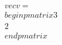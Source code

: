 \documentclass[preview]{standalone}
\begin{document}
\begin{align*}
\quad\\vec{v} = \quad\\begin{pmatrix} 3 \quad\\ 2 \quad\\end{pmatrix}
\end{align*}
\end{document}
